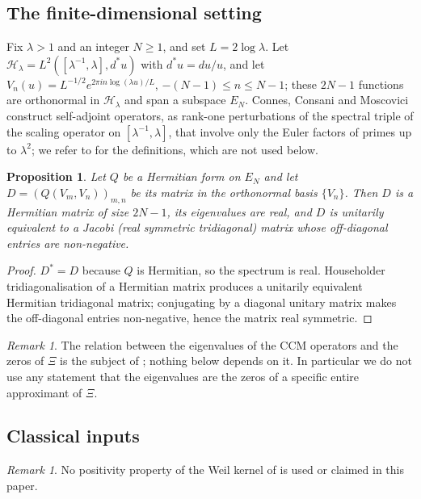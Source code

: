\documentclass[11pt]{amsart}
\newtheorem{proposition}[theorem]{Proposition}
\theoremstyle{definition}
\theoremstyle{remark}
\newtheorem{remark}[theorem]{Remark}
\newtheorem*{remark*}{Remark}
\begin{document}
\subsection{The finite-dimensional setting}
Fix $\lambda>1$ and an integer $N\ge1$, and set $L=2\log\lambda$. Let
$\mathcal H_\lambda=L^2([\lambda^{-1},\lambda],d^\ast u)$ with $d^\ast u=du/u$, and let
$V_n(u)=L^{-1/2}e^{2\pi in\log(\lambda u)/L}$, $-(N-1)\le n\le N-1$; these $2N-1$ functions are
orthonormal in $\mathcal H_\lambda$ and span a subspace $E_N$. Connes, Consani and Moscovici
\cite{CCM} construct self-adjoint operators, as rank-one perturbations of the spectral triple of
the scaling operator on $[\lambda^{-1},\lambda]$, that involve only the Euler factors of primes
up to $\lambda^2$; we refer to \cite{CCM} for the definitions, which are not used below.

\begin{proposition}\label{thm:ccm}
Let $Q$ be a Hermitian form on $E_N$ and let $D=(Q(V_m,V_n))_{m,n}$ be its matrix in the
orthonormal basis $\{V_n\}$. Then $D$ is a Hermitian matrix of size $2N-1$, its eigenvalues are
real, and $D$ is unitarily equivalent to a Jacobi (real symmetric tridiagonal) matrix whose
off-diagonal entries are non-negative.
\end{proposition}
\begin{proof}
$D^\ast=D$ because $Q$ is Hermitian, so the spectrum is real. Householder tridiagonalisation of a Hermitian matrix produces a unitarily equivalent Hermitian tridiagonal matrix; conjugating by a diagonal unitary matrix makes the off-diagonal entries non-negative, hence the matrix real symmetric.
\end{proof}

\begin{remark*}
The relation between the eigenvalues of the CCM operators and the zeros of $\Xi$ is the subject
of \cite{CCM}; nothing below depends on it. In particular we do not use any statement that the
eigenvalues are the zeros of a specific entire approximant of $\Xi$.
\end{remark*}

\subsection{Classical inputs}
\begin{remark}\label{prop:kpos}
No positivity property of the Weil kernel of \cite{CCM} is used or claimed in this paper.
\end{remark}
\end{document}
